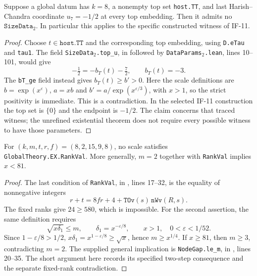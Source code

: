 \begin{proposition}
Suppose a global datum has $k=8$, a nonempty top set
\texttt{host.TT}, and last Harish--Chandra coordinate
$u_7=-1/2$ at every top embedding. Then it admits no
$\texttt{SizeData}_2$. In particular this applies to the
specific constructed witness of IF-11.
\end{proposition}
\begin{proof}
Choose $t\in\texttt{host.TT}$ and the corresponding top embedding,
using \texttt{D.eTau} and \texttt{tau1}. The field
\texttt{SizeData}\(_2\)\texttt{.top\_u}, in
 followed by
\texttt{DataParams}\(_2\)\texttt{.lean}, lines 10--101,
would give
\[
 -\tfrac12=-b_T(t)-\tfrac72,\qquad b_T(t)=-3.
\]
The \texttt{bT\_ge} field instead gives $b_T(t)\ge b'>0$.
Here the scale definitions are
$b=\exp(x^\varepsilon)$, $a=xb$ and
$b'=a/\exp(x^{\varepsilon/3})$, with $x>1$, so the strict
positivity is immediate. This is a contradiction. In the selected
IF-11 construction the top set is $\{0\}$ and the endpoint is
$-1/2$. The claim concerns that traced witness; the unrefined
existential theorem does not require every possible witness to
have those parameters.
\end{proof}

\begin{proposition}
For $(k,m,t,r,f)=(8,2,15,9,8)$, no scale satisfies
\texttt{GlobalTheory.EX.RankVal}. More generally,
$m=2$ together with \texttt{RankVal} implies $x<81$.
\end{proposition}
\begin{proof}
The last condition of \texttt{RankVal}, in
,
lines 17--32, is the equality of nonnegative integers
\[
 r+t=8fr+4+\texttt{TOv}(s)\,\texttt{nWv}(R,s).
\]
The fixed ranks give $24\ge580$, which is impossible.
For the second assertion, the same definition requires
\[
 \sqrt{x\delta_1}\le m,\qquad
 \delta_1=x^{-\varepsilon/8},\qquad
 x>1,\quad 0<\varepsilon<1/52.
\]
Since $1-\varepsilon/8>1/2$,
$x\delta_1=x^{1-\varepsilon/8}\ge\sqrt{x}$, hence
$m\ge x^{1/4}$. If $x\ge81$, then $m\ge3$,
contradicting $m=2$. The supplied general implication is
\texttt{NodeGap.le\_m}, in
,
lines 20--35. The short argument here records its specified
two-step consequence and the separate fixed-rank contradiction.
\end{proof}

